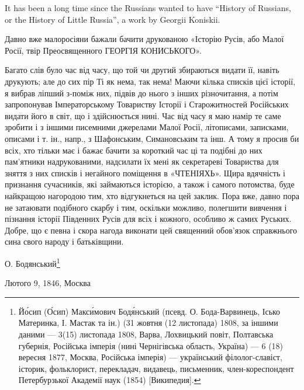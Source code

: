  
 
 
 
 

\begin{zznagolos}
\raggedcolumns
\begin{multicols}{2} %
\setlength{\parindent}{0pt}

It has been a long time since the Russians wanted to have \enquote{History of
Russians, or the History of Little Russia}, a work by Georgii Koniskii.

Давно вже малоросіяни бажали бачити друкованою «Історію Русів, або Малої Росії,
твір Преосвященного ГЕОРГІЯ КОНИСЬКОГО».

Багато слів було час від часу, що той чи другий збираються видати її, навіть
друкують; але до сих пір Ті як нема, так нема! Маючи кілька списків цієї
історії, я вибрав ліпший з-поміж них, підвів до нього з інших різночитання, а
потім запропонував Імператорському Товариству Історії і Старожитностей
Російських видати його в світ, що і здійснюється нині. Час від часу я маю намір
те саме зробити і з іншими писемними джерелами Малої Росії, літописами,
записками, описами і т. ін., напр., з Шафонським, Симановським та інш.  А тому
я просив би всіх, хто тільки має і бажає бачити за короткий час ці та подібні
до них пам'ятники надрукованими, надсилати їх мені як секретареві Товариства
для зняття з них списків і негайного поміщення в «ЧТЕНІЯХЬ». Щира вдячність і
признання сучасників, які займаються історією, а також і самого потомства, буде
найкращою нагородою тим, хто відгукнеться на цей заклик. Пора вже, давно пора
не затаювати подібного скарбу і тим, оскільки можливо, полегшити вивчення і
пізнання історії Південних Русів для всіх і кожного, особливо ж самих Руських.
Добре, що є певна і скора нагода виконати цей священний обов'язок справжнього
сина свого народу і батьківщини.

О. Бодянський\footnote{%
Йо́сип (О́сип) Макси́мович Бодя́нський (псевд. О. Бода-Варвинець, Ісько
Материнка, І. Мастак та ін.) (31 жовтня (12 листопада) 1808, за іншими
даними — 3(15) листопада 1808, Варва, Лохвицький повіт, Полтавська
губернія, Російська імперія (нині Чернігівська область, Україна) — 6
(18) вересня 1877, Москва, Російська імперія) — український
філолог-славіст, історик, фольклорист, перекладач, видавець, письменник,
член-кореспондент Петербурзької Академії наук (1854) [Википедия].
}

Лютого 9, 1846, Москва

\end{multicols} %
\end{zznagolos}

